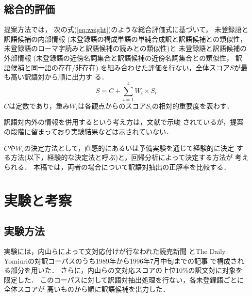 \subsection{総合的評価}
\label{sec:conditions:integration}

提案方法では，
次の式(\ref{eq:weight})のような総合評価式に基づいて，
未登録語と訳語候補の内部情報
(未登録語の構成単語の単純合成訳と訳語候補との類似性，
未登録語のローマ字読みと訳語候補の読みとの類似性)と
未登録語と訳語候補の外部情報
(未登録語の近傍名詞集合と訳語候補の近傍名詞集合との類似性，
訳語候補と同一語の存在/非存在)
を組み合わせた評価を行ない，全体スコア$S$が最も高い訳語対から順に出力す
る．
\begin{equation}
S = C + \displaystyle \sum_{i=1}^{4} W_i \times S_i
\label{eq:weight}
\end{equation}
$C$は定数であり，重み$W_i$は各観点からのスコア$S_i$の相対的重要度を表わす．

訳語対内外の情報を併用するという考え方は，文献\cite{Kaji01}で示唆
されているが，提案の段階に留まっており実験結果などは示されていない．

$C$や$W_i$の決定方法として，直感的にあるいは予備実験を通じて経験的に決定
する方法(以下，経験的な決定法と呼ぶ)と，回帰分析によって決定する方法が
考えられる． 
本稿では，両者の場合について訳語対抽出の正解率を比較する．


\section{実験と考察}
\label{sec:experiment}


\subsection{実験方法}
\label{sec:experiment:method}

実験には，内山ら\cite{Uchiyama03}によって文対応付けが行なわれた読売新聞
とThe Daily Yomiuriの対訳コーパスのうち1989年から1996年7月中旬までの記事
で構成される部分を用いた．
さらに，内山らの文対応スコアの上位10\%の訳文対に対象を限定した．
このコーパスに対して訳語対抽出処理を行ない，各未登録語ごとに全体スコアが
高いものから順に訳語候補を出力した．

